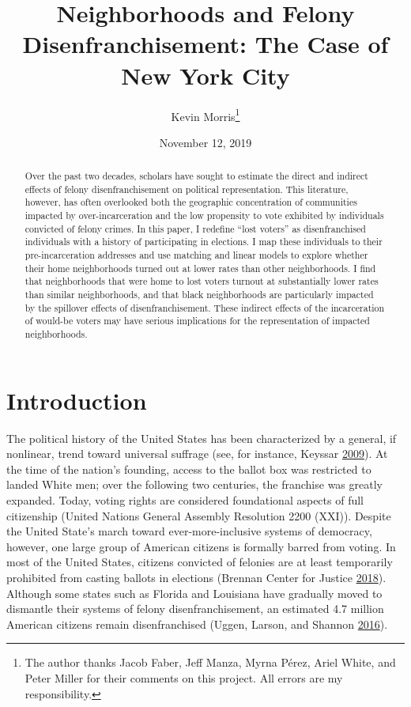 \documentclass[12pt,]{article}
\title{Neighborhoods and Felony Disenfranchisement: The Case of New York City}
\author{Kevin Morris\footnote{The author thanks Jacob Faber, Jeff Manza, Myrna Pérez, Ariel White, and Peter Miller for their comments on this project. All errors are my responsibility.}}
\date{November 12, 2019}
\begin{document}
\maketitle
\begin{abstract}
Over the past two decades, scholars have sought to estimate the direct and indirect effects of felony disenfranchisement on political representation. This literature, however, has often overlooked both the geographic concentration of communities impacted by over-incarceration and the low propensity to vote exhibited by individuals convicted of felony crimes. In this paper, I redefine ``lost voters'' as disenfranchised individuals with a history of participating in elections. I map these individuals to their pre-incarceration addresses and use matching and linear models to explore whether their home neighborhoods turned out at lower rates than other neighborhoods. I find that neighborhoods that were home to lost voters turnout at substantially lower rates than similar neighborhoods, and that black neighborhoods are particularly impacted by the spillover effects of disenfranchisement. These indirect effects of the incarceration of would-be voters may have serious implications for the representation of impacted neighborhoods.
\end{abstract}

\pagebreak


\hypertarget{introduction}{%
\section*{Introduction}\label{introduction}}

The political history of the United States has been characterized by a general, if nonlinear, trend toward universal suffrage (see, for instance, Keyssar \protect\hyperlink{ref-Keyssar2009}{2009}). At the time of the nation's founding, access to the ballot box was restricted to landed White men; over the following two centuries, the franchise was greatly expanded. Today, voting rights are considered foundational aspects of full citizenship (United Nations General Assembly Resolution 2200 (XXI)). Despite the United State's march toward ever-more-inclusive systems of democracy, however, one large group of American citizens is formally barred from voting. In most of the United States, citizens convicted of felonies are at least temporarily prohibited from casting ballots in elections (Brennan Center for Justice \protect\hyperlink{ref-bcj_laws}{2018}). Although some states such as Florida and Louisiana have gradually moved to dismantle their systems of felony disenfranchisement, an estimated 4.7 million American citizens remain disenfranchised (Uggen, Larson, and Shannon \protect\hyperlink{ref-sentencing_2016}{2016}).
\end{document}
